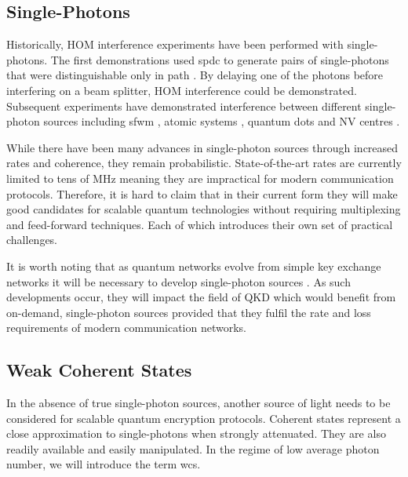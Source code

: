 
\subsection{Single-Photons}

Historically, \acl{HOM} interference experiments have been performed with single-photons. The first demonstrations used \ac{spdc} to generate pairs of single-photons that were distinguishable only in path \cite{HOM, Rarity1989}. By delaying one of the photons before interfering on a beam splitter, \ac{HOM} interference could be demonstrated. Subsequent experiments have demonstrated interference between different single-photon sources including \ac{sfwm} \cite{jiang2015}, atomic systems \cite{Leong2015}, quantum dots \cite{somaschi2016} and NV centres \cite{Bernien2012}.


While there have been many advances in single-photon sources through increased rates and coherence, they remain probabilistic. State-of-the-art rates are currently limited to tens of MHz \cite{chen2018} meaning they are impractical for modern communication protocols. Therefore, it is hard to claim that in their current form they will make good candidates for scalable quantum technologies without requiring multiplexing and feed-forward techniques. Each of which introduces their own set of practical challenges. 

It is worth noting that as quantum networks evolve from simple key exchange networks it will be necessary to develop single-photon sources \cite{wehner2018}. As such developments occur, they will impact the field of \ac{QKD} which would benefit from on-demand, single-photon sources provided that they fulfil the rate and loss requirements of modern communication networks. 


\subsection{Weak Coherent States}

In the absence of true single-photon sources, another source of light needs to be considered for scalable quantum encryption protocols. Coherent states represent a close approximation to single-photons when strongly attenuated. They are also readily available and easily manipulated. In the regime of low average photon number, we will introduce the term \ac{wcs}. 

